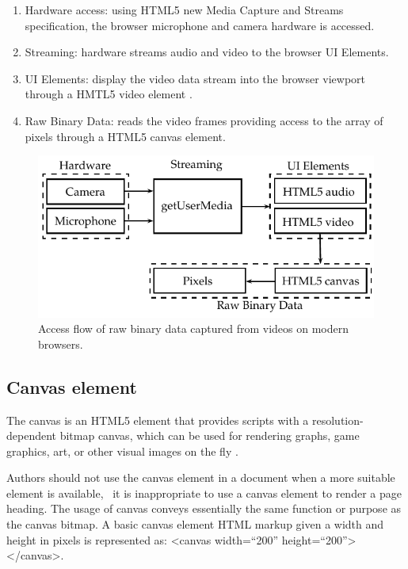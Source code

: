 \begin{enumerate}
  \item Hardware access: using HTML5 new Media Capture and Streams specification, the browser microphone and camera hardware is accessed.
  \item Streaming: hardware streams audio and video to the browser UI Elements.
  \item UI Elements: display the video data stream into the browser viewport through a HMTL5 video element \cite{WC2006}.
  \item Raw Binary Data: reads the video frames providing access to the array of pixels through a HTML5 canvas element.
\end{enumerate}

\begin{figure}[!htb]
  \centering
  \includegraphics{chapters/basic_concepts/get_user_media.pdf}
  \caption{Access flow of raw binary data captured from videos on modern browsers.}
  \label{figure:get_user_media}
\end{figure}


\subsection{Canvas element} %
\label{sub:basic_concepts:web:canvas_element}

The canvas is an HTML5 element that provides scripts with a resolution-dependent bitmap canvas, which can be used for rendering graphs, game graphics, art, or other visual images on the fly \cite{Canvas2013}.

Authors should not use the canvas element in a document when a more suitable element is available, \eg\ it is inappropriate to use a canvas element to render a page heading. The usage of canvas conveys essentially the same function or purpose as the canvas bitmap. A basic canvas element HTML markup given a width and height in pixels is represented as: <canvas width=``200'' height=``200''></canvas>.

